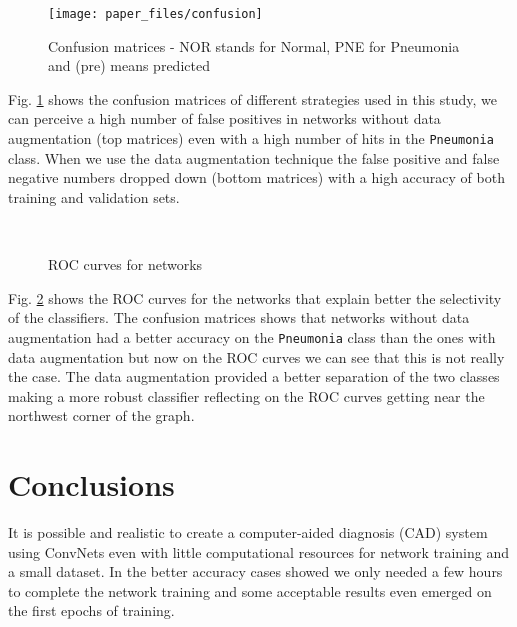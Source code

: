\documentclass[twocolumn]{article}
\newcommand{\tamfig}{0.9}
\newcommand{\tammeiafig}{0.45}
\begin{document}
\begin{figure}[h]
\texttt{[image: paper\_files/confusion]}
\caption[Confusion matrices]{Confusion matrices - NOR stands for Normal, PNE for Pneumonia and (pre) means predicted}
\label{grafico_confusao}
\end{figure}

Fig. \ref{grafico_confusao} shows the confusion matrices of different strategies used in this study, we can perceive a high number of false positives in networks without data augmentation (top matrices) even with a high number of hits in the \texttt{Pneumonia} class. When we use the data augmentation technique the false positive and false negative numbers dropped down (bottom matrices) with a high accuracy of both training and validation sets. 

\begin{figure}[h]
{}
\\
\caption{ROC curves for networks}
\label{grafico_roc}
\end{figure}

Fig. \ref{grafico_roc} shows the ROC curves for the networks that explain better the selectivity  of the classifiers. The confusion matrices shows that networks without data augmentation had a better accuracy on the \texttt{Pneumonia} class than the ones with data augmentation but now on the ROC curves we can see that this is not really the case. The data augmentation provided a better separation of the two classes making a more robust classifier reflecting on the ROC curves getting near the northwest corner of the graph.


\section{Conclusions}
It is possible and realistic to create a computer-aided diagnosis (CAD) system using ConvNets even with little computational resources for network training and a small dataset. In the better accuracy cases showed we only needed a few hours to complete the network training and some acceptable results even emerged on the first epochs of training.
\end{document}
